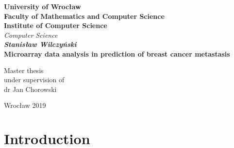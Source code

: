 \documentclass[12pt, wide]{mwart}
\newcommand\blankpage{%
    \null
    \thispagestyle{empty}%
    \newpage}
\begin{document}
\newpage
\thispagestyle{empty}
\begin{center}
\textbf{\large University of Wrocław \\Faculty of Mathematics and Computer Science\\ Institute of Computer Science}\\
\textit{\large  Computer Science}\\
\vspace{4cm}
\textbf{\textit{\large Stanisław Wilczyński}\\
\vspace{0.5cm}
{\Large Microarray data analysis in prediction of breast cancer metastasis}}\\
\end{center}
\vspace{3cm}
\begin{center}

\large {Master thesis\\
under supervision of\\
dr Jan Chorowski\\}

\end{center}

\vfill
\begin{center}
\large Wrocław 2019\\
\end{center}

\afterpage{\blankpage}
\newpage
\tableofcontents    
\section{Introduction}
\end{document}

